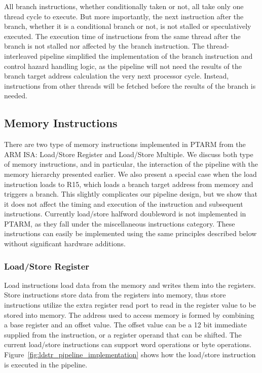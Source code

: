 All branch instructions, whether conditionally taken or not, all take only one thread cycle to execute.
But more importantly, the next instruction after the branch, whether it is a conditional branch or not, is not stalled or speculatively executed. 
The execution time of instructions from the same thread after the branch is not stalled nor affected by the branch instruction.  
The thread-interleaved pipeline simplified the implementation of the branch instruction and control hazard handling logic, as the pipeline will not need the results of the branch target address calculation the very next processor cycle.  
Instead, instructions from other threads will be fetched before the results of the branch is needed.

\subsection{Memory Instructions}
There are two type of memory instructions implemented in PTARM from the ARM ISA: Load/Store Register and Load/Store Multiple.
We discuss both type of memory instructions, and in particular, the interaction of the pipeline with the memory hierarchy presented earlier. 
We also present a special case when the load instruction loads to R15, which loads a branch target address from memory and triggers a branch.  
This slightly complicates our pipeline design, but we show that it does not affect the timing and execution of the instruction and subsequent instructions.
Currently load/store halfword doubleword is not implemented in PTARM, as they fall under the miscellaneous instructions category. 
These instructions can easily be implemented using the same principles described below without significant hardware additions.       
  
\subsubsection{Load/Store Register}
\label{sec:ptarm_instruction_ldstr}

Load instructions load data from the memory and writes them into the registers.
Store instructions store data from the registers into memory, thus store instructions utilize the extra register read port to read in the register value to be stored into memory.
The address used to access memory is formed by combining a base register and an offset value.
The offset value can be a 12 bit immediate supplied from the instruction, or a register operand that can be shifted.
The current load/store instructions can support word operations or byte operations.
Figure~\ref{fig:ldstr_pipeline_implementation} shows how the load/store instruction is executed in the pipeline.

